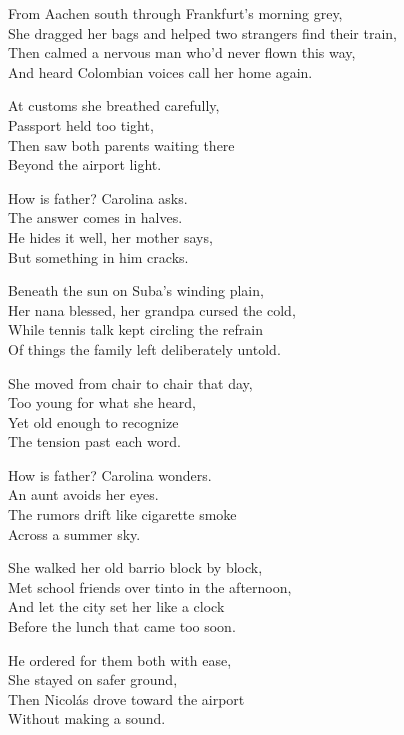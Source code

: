 \begin{lyrics}

From Aachen south through Frankfurt's morning grey,\\
She dragged her bags and helped two strangers find their train,\\
Then calmed a nervous man who'd never flown this way,\\
And heard Colombian voices call her home again.

At customs she breathed carefully,\\
Passport held too tight,\\
Then saw both parents waiting there\\
Beyond the airport light.

How is father? Carolina asks.\\
The answer comes in halves.\\
He hides it well, her mother says,\\
But something in him cracks.

Beneath the sun on Suba's winding plain,\\
Her nana blessed, her grandpa cursed the cold,\\
While tennis talk kept circling the refrain\\
Of things the family left deliberately untold.

She moved from chair to chair that day,\\
Too young for what she heard,\\
Yet old enough to recognize\\
The tension past each word.

How is father? Carolina wonders.\\
An aunt avoids her eyes.\\
The rumors drift like cigarette smoke\\
Across a summer sky.

She walked her old barrio block by block,\\
Met school friends over tinto in the afternoon,\\
And let the city set her like a clock\\
Before the lunch that came too soon.

He ordered for them both with ease,\\
She stayed on safer ground,\\
Then Nicolás drove toward the airport\\
Without making a sound.


\end{lyrics}
